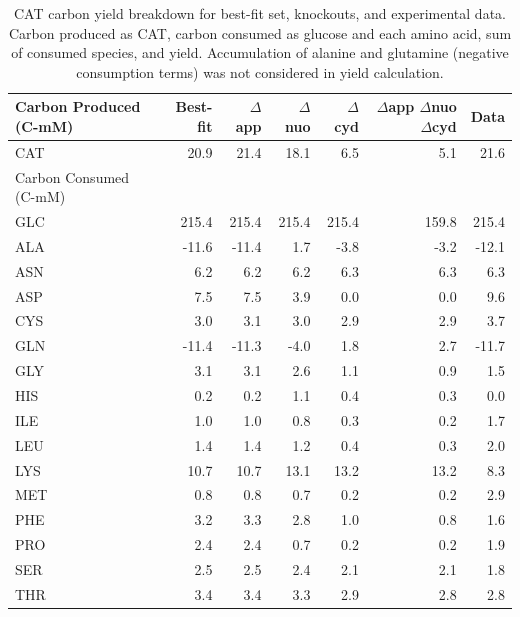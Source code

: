 \documentclass[12pt]{article}
\begin{document}
\begin{table}
\centering
    \caption{CAT carbon yield breakdown for best-fit set, knockouts, and experimental data. Carbon produced as CAT, carbon consumed as glucose and each amino acid, sum of consumed species, and yield. Accumulation of alanine and glutamine (negative consumption terms) was not considered in yield calculation.}
    \renewcommand{\arraystretch}{1.3}
    \begin{tabular}{lrrrrrr} \toprule
        Carbon Produced (C-mM) & Best-fit & $\Delta$app & $\Delta$nuo & $\Delta$cyd & \parbox{1 cm}{$\Delta$app $\Delta$nuo $\Delta$cyd} & Data \\ \hline
        CAT & 20.9 & 21.4 & 18.1 & 6.5 & 5.1 & 21.6 \\ \midrule
        Carbon Consumed (C-mM) \\ \hline
        GLC & 215.4 & 215.4 & 215.4 & 215.4 & 159.8 & 215.4 \\ \hline
        ALA & -11.6 & -11.4 & 1.7 & -3.8 & -3.2 & -12.1 \\ \hline
        ASN & 6.2 & 6.2 & 6.2 & 6.3 & 6.3 & 6.3 \\ \hline
        ASP & 7.5 & 7.5 & 3.9 & 0.0 & 0.0 & 9.6 \\ \hline
        CYS & 3.0 & 3.1 & 3.0 & 2.9 & 2.9 & 3.7 \\ \hline
        GLN & -11.4 & -11.3 & -4.0 & 1.8 & 2.7 & -11.7 \\ \hline
        GLY & 3.1 & 3.1 & 2.6 & 1.1 & 0.9 & 1.5 \\ \hline
        HIS & 0.2 & 0.2 & 1.1 & 0.4 & 0.3 & 0.0 \\ \hline
        ILE & 1.0 & 1.0 & 0.8 & 0.3 & 0.2 & 1.7 \\ \hline
        LEU & 1.4 & 1.4 & 1.2 & 0.4 & 0.3 & 2.0 \\ \hline
        LYS & 10.7 & 10.7 & 13.1 & 13.2 & 13.2 & 8.3 \\ \hline
        MET & 0.8 & 0.8 & 0.7 & 0.2 & 0.2 & 2.9 \\ \hline
        PHE & 3.2 & 3.3 & 2.8 & 1.0 & 0.8 & 1.6 \\ \hline
        PRO & 2.4 & 2.4 & 0.7 & 0.2 & 0.2 & 1.9 \\ \hline
        SER & 2.5 & 2.5 & 2.4 & 2.1 & 2.1 & 1.8 \\ \hline
        THR & 3.4 & 3.4 & 3.3 & 2.9 & 2.8 & 2.8 \\ \hline

\end{tabular}
\end{table}
\end{document}
